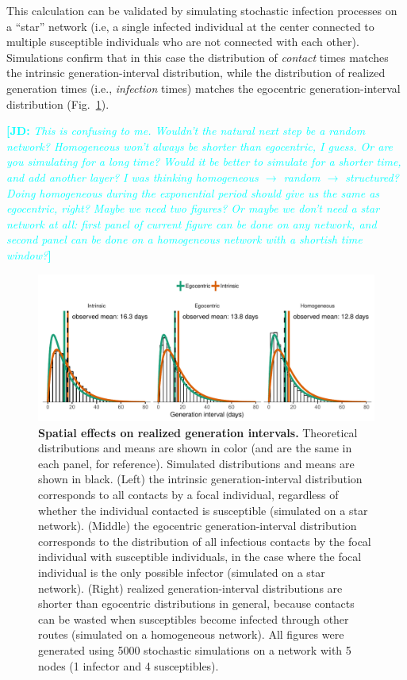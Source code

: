 \documentclass[12pt]{article}
\newcommand{\fref}[1]{Fig.~\ref{fig:#1}}
\newcommand{\comment}[3]{\textcolor{#1}{\textbf{[#2: }\textsl{#3}\textbf{]}}}
\newcommand{\jd}[1]{\comment{cyan}{JD}{#1}}
\begin{document}
This calculation can be validated by simulating stochastic infection processes on a ``star'' network (i.e, a single infected individual at the center connected to multiple susceptible individuals who are not connected with each other).
Simulations confirm that in this case the distribution of \emph{contact} times matches the intrinsic generation-interval distribution, while the distribution of realized generation times (i.e., \emph{infection} times) matches the egocentric generation-interval distribution (\fref{local}).

\jd{This is confusing to me. Wouldn't the natural next step be a random network? Homogeneous won't always be shorter than egocentric, I guess. Or are you simulating for a long time? Would it be better to simulate for a shorter time, and add another layer? I was thinking homogeneous $\to$ random $\to$ structured? Doing homogeneous during the exponential period should give us the same as egocentric, right? Maybe we need two figures? Or maybe we don't need a star network at all: first panel of current figure can be done on any network, and second panel can be done on a homogeneous network with a shortish time window?} 
\begin{figure}
\includegraphics[width=\textwidth]{../fig/local_effect.pdf}
\caption{
\textbf{Spatial effects on realized generation intervals.}
Theoretical distributions and means are shown in color (and are the same in each panel, for reference). Simulated distributions and means are shown in black.
(Left) the intrinsic generation-interval distribution corresponds to all contacts by a focal individual, regardless of whether the individual contacted is susceptible (simulated on a star network).
(Middle) the egocentric generation-interval distribution corresponds to the distribution of all infectious contacts by the focal individual with susceptible individuals, in the case where the focal individual is the only possible infector (simulated on a star network).
(Right) realized generation-interval distributions are shorter than egocentric distributions in general, because contacts can be wasted when susceptibles become infected through other routes (simulated on a homogeneous network).
All figures were generated using 5000 stochastic simulations on a network with 5 nodes (1 infector and 4 susceptibles).
}
\label{fig:local}
\end{figure}
\end{document}
